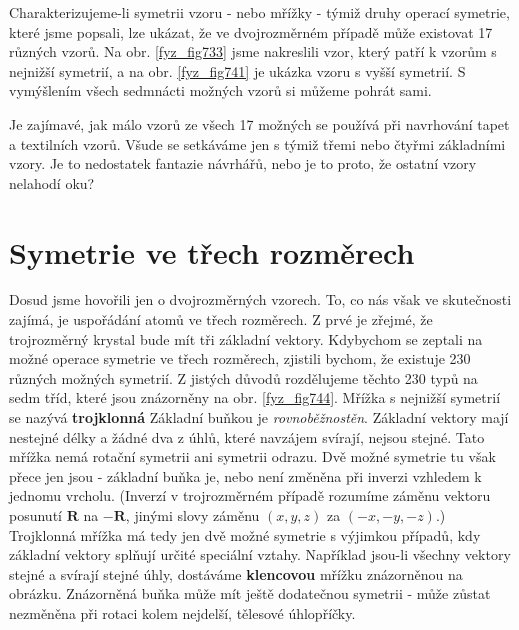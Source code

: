 {    Charakterizujeme-li symetrii vzoru - nebo mřížky - týmiž druhy operací symetrie, které jsme 
    popsali, lze ukázat, že ve dvojrozměrném případě může existovat \num{17} různých vzorů. Na obr. 
    \ref{fyz_fig733} jsme nakreslili vzor, který patří k vzorům s nejnižší symetrií, a na obr. 
    \ref{fyz_fig741} je ukázka vzoru s vyšší symetrií. S vymýšlením všech sedmnácti možných vzorů 
    si můžeme pohrát sami.
    
    Je zajímavé, jak málo vzorů ze všech \num{17} možných se používá při navrhování tapet a 
    textilních vzorů. Všude se setkáváme jen s týmiž třemi nebo čtyřmi základními vzory. Je to 
    nedostatek fantazie návrhářů, nebo je to proto, že ostatní vzory nelahodí oku?
    
  \section{Symetrie ve třech rozměrech}\label{fyz:IIchapXXXsecVI}
    Dosud jsme hovořili jen o dvojrozměrných vzorech. To, co nás však ve skutečnosti zajímá, je 
    uspořádání atomů ve třech rozměrech. Z prvé je zřejmé, že trojrozměrný krystal bude mít tři 
    základní vektory. Kdybychom se zeptali na možné operace symetrie ve třech rozměrech, zjistili 
    bychom, že existuje \num{230} různých možných symetrií. Z jistých důvodů rozdělujeme těchto 
    \num{230} typů na sedm tříd, které jsou znázorněny na obr. \ref{fyz_fig744}. Mřížka s nejnižší 
    symetrií se nazývá \textbf{trojklonná} Základní buňkou je \emph{rovnoběžnostěn}. Základní 
    vektory mají nestejné délky a žádné dva z úhlů, které navzájem svírají, nejsou stejné. Tato 
    mřížka nemá rotační symetrii ani symetrii odrazu. Dvě možné symetrie tu však přece jen jsou - 
    základní buňka je, nebo není změněna při inverzi vzhledem k jednomu vrcholu. (Inverzí v 
    trojrozměrném případě rozumíme záměnu vektoru posunutí \(\bm{R}\) na \(\bm{-R}\), jinými slovy 
    záměnu \((x, y, z)\) za \((-x, -y, -z)\).) Trojklonná mřížka má tedy jen dvě možné symetrie s 
    výjimkou případů, kdy základní vektory splňují určité speciální vztahy. Například jsou-li 
    všechny vektory stejné a svírají stejné úhly, dostáváme \textbf{klencovou} mřížku znázorněnou 
    na obrázku. Znázorněná buňka může mít ještě dodatečnou symetrii - může zůstat nezměněna při 
    rotaci kolem nejdelší, tělesové úhlopříčky.
    

}

